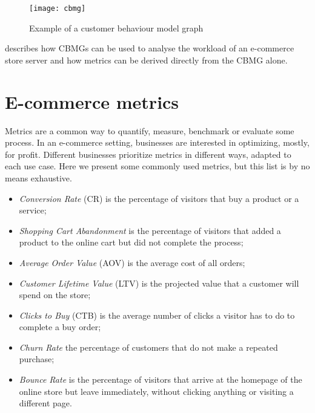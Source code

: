 \begin{figure}[h]
    \begin{center}
        \leavevmode
        \texttt{[image: cbmg]}
        \caption{Example of a customer behaviour model graph \cite{Menasce1999}}
        \label{fig:cbmg}
    \end{center}
\end{figure}

\cite{Menasce1999} describes how CBMGs can be used to analyse the workload of 
an e-commerce store server and how metrics can be derived directly from the 
CBMG alone.

\section{E-commerce metrics}

Metrics are a common way to quantify, measure, benchmark or evaluate some 
process. In an e-commerce setting, businesses are interested in optimizing, 
mostly, for profit. Different businesses prioritize metrics in different ways, 
adapted to each use case. Here we present some commonly used metrics, but this 
list is by no means exhaustive. \cite{Sterne2000, Menasce1999}


\begin{itemize}
    \item \textit{Conversion Rate} (CR) is the percentage of visitors that buy 
    a product or a service;
    \item \textit{Shopping Cart Abandonment} is the percentage of visitors that 
    added a product to the online cart but did not complete the process;
    \item \textit{Average Order Value} (AOV) is the average cost of all orders;
    \item \textit{Customer Lifetime Value} (LTV) is the projected value that a 
    customer will spend on the store;
    \item \textit{Clicks to Buy} (CTB) is the average number of clicks a 
    visitor has to do to complete a buy order;
    \item \textit{Churn Rate} the percentage of customers that do not make a 
    repeated purchase;
    \item \textit{Bounce Rate} is the percentage of visitors that arrive at the 
    homepage of the online store but leave immediately, without clicking 
    anything or visiting a different page.
\end{itemize}

